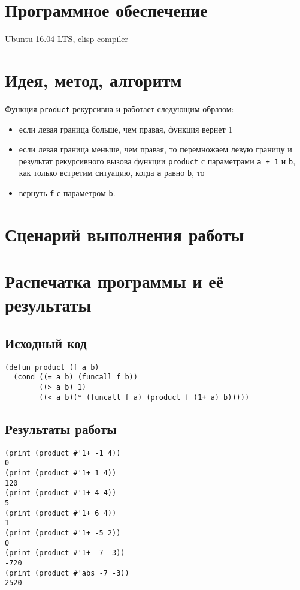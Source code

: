 \documentclass[12pt]{article}
\begin{document}
\section{Программное обеспечение}
Ubuntu 16.04 LTS, clisp compiler

\section{Идея, метод, алгоритм}
Функция {\tt product} рекурсивна и работает следующим образом:
\begin{itemize}
\setlength{\itemsep}{-1mm} %
\item если левая граница больше, чем правая, функция вернет 1
\item если левая граница меньше, чем правая, то перемножаем левую границу и результат рекурсивного вызова функции {\tt product} с параметрами {\tt a + 1} и {\tt b}, как только встретим ситуацию, когда {\tt a} равно {\tt b}, то
\item вернуть {\tt f} с параметром {\tt b}.
\end{itemize}

\section{Сценарий выполнения работы}

\section{Распечатка программы и её результаты}

\subsection{Исходный код}

\begin{lstlisting}
(defun product (f a b)
  (cond ((= a b) (funcall f b))
        ((> a b) 1)
        ((< a b)(* (funcall f a) (product f (1+ a) b)))))
\end{lstlisting}

\subsection{Результаты работы}
\begin{lstlisting}
(print (product #'1+ -1 4))
0
(print (product #'1+ 1 4))
120
(print (product #'1+ 4 4))
5
(print (product #'1+ 6 4))
1
(print (product #'1+ -5 2))
0
(print (product #'1+ -7 -3))
-720
(print (product #'abs -7 -3))
2520
\end{lstlisting}
\end{document}
